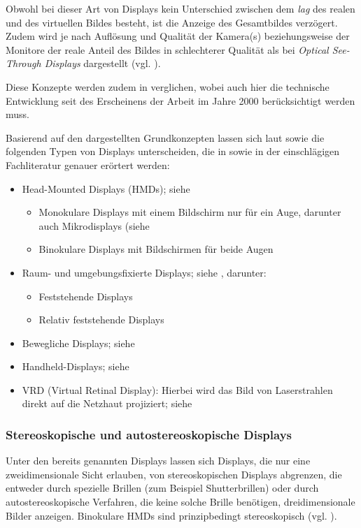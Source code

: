 \documentclass[ngerman,pdftex,paper=A4,DIV=calc,titlepage,12pt]{scrartcl}
\newtheorem[L]{boxedDefinition}{Definition}
\begin{document}
\begin{itemize}
 Obwohl bei dieser Art von Displays kein Unterschied zwischen dem \textit{lag} des realen und des virtuellen Bildes besteht, ist die Anzeige des Gesamtbildes verzögert. Zudem wird je nach Auflösung und Qualität der Kamera(s) beziehungsweise der Monitore der reale Anteil des Bildes in schlechterer Qualität als bei \textit{Optical See-Through Displays} dargestellt (vgl. \cite[Kapitel 2.2, Seite 22]{Toe2010}). 
\end{itemize}
Diese Konzepte werden zudem in \cite{Rolland2000} verglichen, wobei auch hier die technische Entwicklung seit des Erscheinens der Arbeit im Jahre 2000 berücksichtigt werden muss.

Basierend auf den dargestellten Grundkonzepten lassen sich laut \cite[Kapitel 2.2, Seite 22-30]{Toe2010} sowie \cite[Kapitel 3.1, Seiten 4-7]{Suthau2002DE} die folgenden Typen von Displays unterscheiden, die in \cite{Toe2010} sowie in der einschlägigen Fachliteratur genauer erörtert werden:
 \begin{itemize}
 \item Head-Mounted Displays (HMDs); siehe \cite[Kapitel 2.2.1, Seite 23-25]{Toe2010}
 \begin{itemize}
  \item Monokulare Displays mit einem Bildschirm nur für ein Auge, darunter auch Mikrodisplays (siehe \cite[Kapitel 3.1, Seite 6]{Suthau2002DE}
  \item Binokulare Displays mit Bildschirmen für beide Augen
 \end{itemize}
 \item Raum- und umgebungsfixierte Displays; siehe \cite[Kapitel 2.2.2, Seite 25-28]{Toe2010}, darunter:
 \begin{itemize}
    \item Feststehende Displays
    \item Relativ feststehende Displays
 \end{itemize}
 \item Bewegliche Displays; siehe \cite[Kapitel 2.2.3, Seite 28]{Toe2010}
 \item Handheld-Displays; siehe \cite[Kapitel 2.2.4, Seite 28f.]{Toe2010}
 \item VRD (Virtual Retinal Display): Hierbei wird das Bild von Laserstrahlen direkt auf die Netzhaut projiziert; siehe \cite[Kapitel 3.1.2, Seite 5f.]{Suthau2002DE}
\end{itemize}

\subsubsection{Stereoskopische und autostereoskopische Displays}
Unter den bereits genannten Displays lassen sich Displays, die nur eine zweidimensionale Sicht erlauben, von stereoskopischen Displays abgrenzen, die entweder durch spezielle Brillen (zum Beispiel Shutterbrillen) oder durch autostereoskopische Verfahren, die keine solche Brille benötigen, dreidimensionale Bilder anzeigen. Binokulare HMDs sind prinzipbedingt stereoskopisch (vgl. \cite[Kapitel 2.2.1, Seite 23-25]{Toe2010}).
\end{document}
